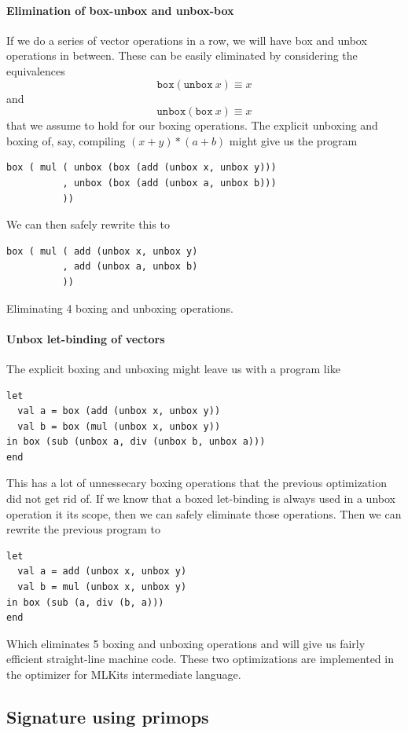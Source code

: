 \documentclass{article}
\begin{document}
\paragraph{Elimination of box-unbox and unbox-box}
If we do a series of vector operations in a row, we will have box and unbox operations in between. These can be easily eliminated by considering the equivalences
\[
    \mathtt{box} (\mathtt{unbox}\ x) \equiv x
\]
and
\[
    \mathtt{unbox} (\mathtt{box}\ x) \equiv x
\]
that we assume to hold for our boxing operations. The explicit unboxing and boxing of, say, compiling $(x + y) * (a + b)$ might give us the program 
\begin{lstlisting}
box ( mul ( unbox (box (add (unbox x, unbox y)))
          , unbox (box (add (unbox a, unbox b)))
          ))
\end{lstlisting}
We can then safely rewrite this to
\begin{lstlisting}
box ( mul ( add (unbox x, unbox y)
          , add (unbox a, unbox b)
          ))
\end{lstlisting}
Eliminating 4 boxing and unboxing operations.

\paragraph{Unbox let-binding of vectors}
The explicit boxing and unboxing might leave us with a program like
\begin{lstlisting}
let
  val a = box (add (unbox x, unbox y))
  val b = box (mul (unbox x, unbox y))
in box (sub (unbox a, div (unbox b, unbox a)))
end
\end{lstlisting}
This has a lot of unnessecary boxing operations that the previous optimization did not get rid of. If we know that a boxed let-binding is always used in a unbox operation it its scope, then we can safely eliminate those operations. Then we can rewrite the previous program to
\begin{lstlisting}
let
  val a = add (unbox x, unbox y)
  val b = mul (unbox x, unbox y)
in box (sub (a, div (b, a)))
end
\end{lstlisting}
Which eliminates 5 boxing and unboxing operations and will give us fairly efficient straight-line machine code. These two optimizations are implemented in the optimizer for MLKits intermediate language.

\subsection{Signature using primops}
\end{document}
